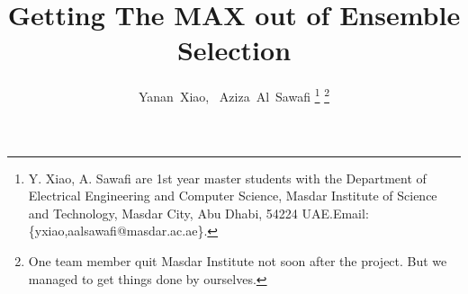 \documentclass[journal]{IEEEtran}
\begin{document}
%

\title{Getting The MAX out of Ensemble Selection}

%
%
%

\author{Yanan~Xiao,~
Aziza~Al~Sawafi%
\thanks{Y. Xiao, A. Sawafi are 1st year master students with the Department of
Electrical Engineering and Computer Science, Masdar Institute of Science and Technology, Masdar City,
Abu Dhabi, 54224 UAE.\@ Email: \{yxiao,aalsawafi@masdar.ac.ae\}.}%
\thanks{One team member quit Masdar Institute not soon after the
  project. But we managed to get things done by ourselves.}}
%

%
%
\end{document}
